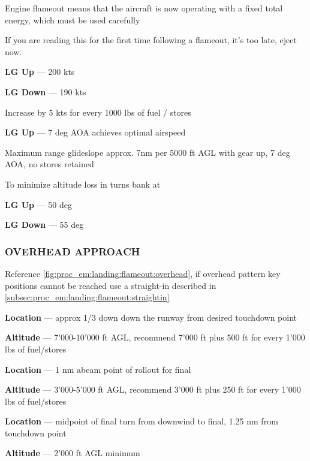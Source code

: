 \begin{tcoloritemize}
    Engine flameout means that the aircraft is now operating with a fixed total energy,
    which must be used carefully

    \medskip
    If you are reading this for the first time following a flameout, 
    it's too late, eject now.

    \textbf{LG Up} --- 200 kts
    
    \medskip
    \textbf{LG Down} --- 190 kts
    
    \bigskip
    Increase by 5 kts for every 1000 lbs of fuel / stores

    \textbf{LG Up} --- 7 deg AOA achieves optimal airspeed

    \blueitem[Glideslope] Maximum range glideslope
    approx. 7nm per 5000 ft AGL with gear up,
    7 deg AOA, no stores retained

    To minimize altitude loss in turns bank at
    
    \medskip
    \textbf{LG Up} --- 50 deg

    \medskip
    \textbf{LG Down} --- 55 deg
\end{tcoloritemize}

\subsubsection{OVERHEAD APPROACH}

\begin{tcoloritemize}
    Reference \cref{fig:proc_em:landing:flameout:overhead}, 
    if overhead pattern key positions cannot be reached use a straight-in 
    described in \cref{subsec:proc_em:landing:flameout:straightin}

    \textbf{Location} --- approx {1/3 down down the runway} from desired touchdown point

    \bigskip
    \textbf{Altitude} --- {7'000-10'000 ft AGL},
    recommend 7'000 ft plus 500 ft for every 1'000 lbs of fuel/stores

    \textbf{Location} --- {1 nm abeam} point of rollout for final 

    \bigskip
    \textbf{Altitude} --- {3'000-5'000 ft AGL},
    recommend 3'000 ft plus 250 ft for every 1'000 lbs of fuel/stores

    \textbf{Location} --- midpoint of final turn from downwind to final,
    {1.25 nm from touchdown point}

    \bigskip
    \textbf{Altitude} --- {2'000 ft AGL minimum}
\end{tcoloritemize}

